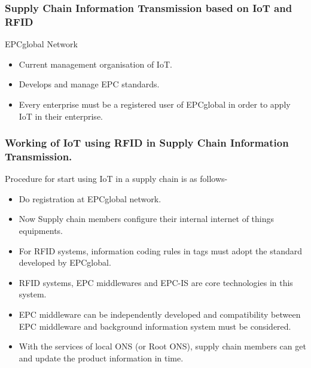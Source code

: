 \documentclass{beamer}
\begin{document}
\begin{frame}
\frametitle{Supply Chain Information Transmission based on IoT and RFID}
\begin{block}{EPCglobal Network}
\begin{itemize}
	\item Current management organisation of IoT.
	\item Develops and manage EPC standards.
	\item Every enterprise must be a registered user of EPCglobal in order to apply IoT in their enterprise.\cite{wiki}
\end{itemize}
\end{block}
\end{frame}


\begin{frame}
\frametitle{Working of IoT using RFID in Supply Chain Information Transmission.}
\begin{block}{Procedure for start using IoT in a supply chain is as follows-}
\begin{itemize}
	\item Do registration at EPCglobal network.
	\item Now Supply chain members configure their internal internet of things equipments.
	\item For RFID systems, information coding rules in tags must adopt the standard developed by EPCglobal.
	\item RFID systems, EPC middlewares and EPC-IS are core technologies in this system.
	\item EPC middleware can be independently developed and compatibility between EPC middleware and background information system must be considered.
	\item With the services of local ONS (or Root ONS), supply chain members can get and update the product information in time.
\end{itemize}
\end{block}
\end{frame}
\end{document}
